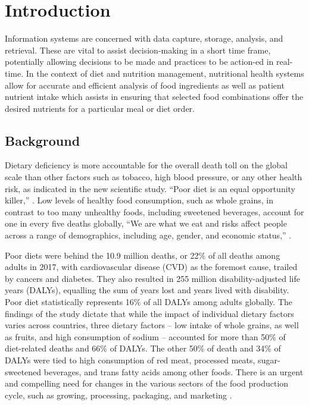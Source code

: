 \documentclass{article}
\begin{document}
\section{Introduction}
\label{Introducion}
Information systems are concerned with data capture, storage, analysis, and retrieval. These are vital to assist decision-making in a short time frame, potentially allowing decisions to be made and practices to be action-ed in real-time.  In the context of diet and nutrition management, nutritional health systems allow for accurate and efficient analysis of food ingredients as well as patient nutrient intake which assists in ensuring that selected food combinations offer the desired nutrients for a particular meal or diet order.


\subsection{Background}
Dietary deficiency is more accountable for the overall death toll on the global scale than other factors such as tobacco, high blood pressure, or any other health risk, as indicated in the new scientific study. “Poor diet is an equal opportunity killer,” \cite{healthdata}. Low levels of healthy food consumption, such as whole grains, in contrast to too many unhealthy foods, including sweetened beverages, account for one in every five deaths globally, “We are what we eat and risks affect people across a range of demographics, including age, gender, and economic status,” \cite{healthdata}.

Poor diets were behind the 10.9 million deaths, or 22\% of all deaths among adults in 2017, with cardiovascular disease (CVD) as the foremost cause, trailed by cancers and diabetes. They also resulted in 255 million disability-adjusted life years (DALYs), equalling the sum of years lost and years lived with disability. Poor diet statistically represents 16\% of all DALYs among adults globally. The findings of the study dictate that while the impact of individual dietary factors varies across countries, three dietary factors – low intake of whole grains, as well as fruits, and high consumption of sodium – accounted for more than 50\% of diet-related deaths and 66\% of DALYs. The other 50\% of death and 34\% of DALYs were tied to high consumption of red meat, processed meats, sugar-sweetened beverages, and trans fatty acids among other foods. There is an urgent and compelling need for changes in the various sectors of the food production cycle, such as growing, processing, packaging, and marketing \cite{healthdata}.
\end{document}
